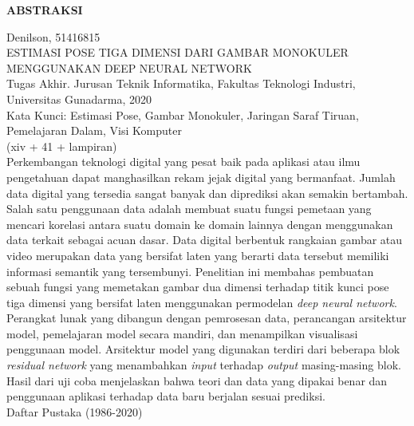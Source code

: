 \newpage %
\begin{center}
    \begin{large}\textbf{ABSTRAKSI}\end{large}
\end{center}

\vspace{5mm}

\noindent Denilson, 51416815 \\
ESTIMASI POSE TIGA DIMENSI DARI GAMBAR MONOKULER MENGGUNAKAN DEEP NEURAL NETWORK\\
Tugas Akhir. Jurusan Teknik Informatika, Fakultas Teknologi Industri, \\
Universitas Gunadarma, 2020\\
Kata Kunci: Estimasi Pose, Gambar Monokuler, Jaringan Saraf Tiruan, Pemelajaran Dalam, Visi Komputer\\
\noindent (xiv + 41 + lampiran)\\

Perkembangan teknologi digital yang pesat baik pada aplikasi atau ilmu pengetahuan dapat
manghasilkan rekam jejak digital yang bermanfaat. Jumlah data digital yang tersedia sangat
banyak dan diprediksi akan semakin bertambah. Salah satu penggunaan data adalah membuat
suatu fungsi pemetaan yang mencari korelasi antara suatu domain ke domain lainnya dengan
menggunakan data terkait sebagai acuan dasar. Data digital berbentuk rangkaian gambar atau video
merupakan data yang bersifat laten yang berarti data tersebut memiliki informasi semantik yang
tersembunyi. Penelitian ini membahas pembuatan sebuah fungsi yang memetakan gambar dua dimensi
terhadap titik kunci pose tiga dimensi yang bersifat laten menggunakan permodelan
\textit{deep neural network}. Perangkat lunak yang dibangun dengan pemrosesan data,
perancangan arsitektur model, pemelajaran model secara mandiri, dan menampilkan visualisasi
penggunaan model. Arsitektur model yang digunakan terdiri dari beberapa blok \textit{residual network}
yang menambahkan \textit{input} terhadap \textit{output} masing-masing blok. Hasil dari uji coba menjelaskan
bahwa teori dan data yang dipakai benar dan penggunaan aplikasi terhadap data baru berjalan
sesuai prediksi.\\


\noindent Daftar Pustaka (1986-2020)
